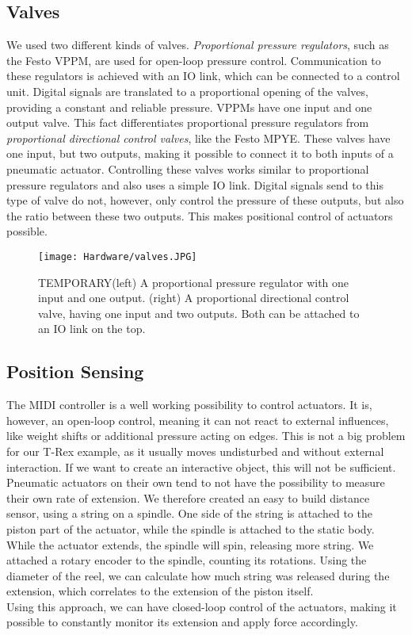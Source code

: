 \subsection{Valves}
We used two different kinds of valves. \textit{Proportional pressure regulators}, such as the Festo VPPM, are used for open-loop pressure control. Communication to these regulators is achieved with an IO link, which can be connected to a control unit. Digital signals are translated to a proportional opening of the valves, providing a constant and reliable pressure. VPPMs have one input and one output valve. This fact differentiates proportional pressure regulators from \textit{proportional directional control valves}, like the Festo MPYE. These valves have one input, but two outputs, making it possible to connect it to both inputs of a pneumatic actuator. Controlling these valves works similar to proportional pressure regulators and also uses a simple IO link. Digital signals send to this type of valve do not, however, only control the pressure of these outputs, but also the ratio between these two outputs. This makes positional control of actuators possible.

\begin{figure}[h!]
    \texttt{[image: Hardware/valves.JPG]}
    \centering
    \caption{TEMPORARY(left) A proportional pressure regulator with one input and one output. (right) A proportional directional control valve, having one input and two outputs. Both can be attached to an IO link on the top.}
    \label{fig:valves}
\end{figure}

\subsection{Position Sensing}
The MIDI controller is a well working possibility to control actuators. It is, however, an open-loop control, meaning it can not react to external influences, like weight shifts or additional pressure acting on edges. This is not a big problem for our T-Rex example, as it usually moves undisturbed and without external interaction. If we want to create an interactive object, this will not be sufficient.\\
Pneumatic actuators on their own tend to not have the possibility to measure their own rate of extension. We therefore created an easy to build distance sensor, using a string on a spindle. One side of the string is attached to the piston part of the actuator, while the spindle is attached to the static body. While the actuator extends, the spindle will spin, releasing more string. We attached a rotary encoder to the spindle, counting its rotations. Using the diameter of the reel, we can calculate how much string was released during the extension, which correlates to the extension of the piston itself.\\
Using this approach, we can have closed-loop control of the actuators, making it possible to constantly monitor its extension and apply force accordingly.

